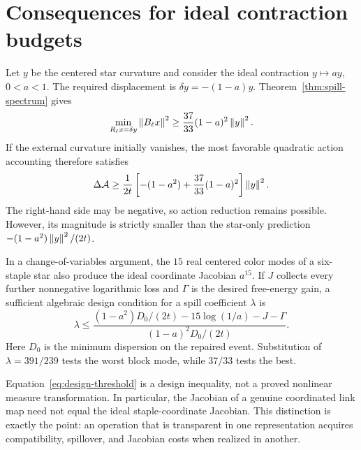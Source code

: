 \section{Consequences for ideal contraction budgets}
\label{sec:repair}

Let $y$ be the centered star curvature and consider the ideal contraction
$y\mapsto ay$, $0<a<1$.  The required displacement is
$\delta y=-(1-a)y$.  Theorem~\ref{thm:spill-spectrum} gives
\[
 \min_{R_\ell x=\delta y}\left\lVert B_\ell x\right\rVert^2
 \ge \frac{37}{33}(1-a)^2\left\lVert y\right\rVert^2.
\]
If the external curvature initially vanishes, the most favorable quadratic
action accounting therefore satisfies
\begin{equation}
\label{eq:action-budget}
 \Delta\mathcal A
 \ge \frac1{2t}\left[
   -(1-a^2)+\frac{37}{33}(1-a)^2
 \right]\left\lVert y\right\rVert^2.
\end{equation}
The right-hand side may be negative, so action reduction remains possible.
However, its magnitude is strictly smaller than the star-only prediction
$-(1-a^2)\left\lVert y\right\rVert^2/(2t)$.

In a change-of-variables argument, the $15$ real centered color modes of a
six-staple star also produce the ideal coordinate Jacobian $a^{15}$.  If $J$
collects every further nonnegative logarithmic loss and $\Gamma$ is the desired
free-energy gain, a sufficient algebraic design condition for a spill
coefficient $\lambda$ is
\begin{equation}
\label{eq:design-threshold}
 \lambda\le
 \frac{(1-a^2)D_0/(2t)-15\log(1/a)-J-\Gamma}
 {(1-a)^2D_0/(2t)}.
\end{equation}
Here $D_0$ is the minimum dispersion on the repaired event.  Substitution of
$\lambda=391/239$ tests the worst block mode, while $37/33$ tests the best.

Equation~\eqref{eq:design-threshold} is a design inequality, not a proved
nonlinear measure transformation.  In particular, the Jacobian of a genuine
coordinated link map need not equal the ideal staple-coordinate Jacobian.
This distinction is exactly the point: an operation that is transparent in
one representation acquires compatibility, spillover, and Jacobian costs when
realized in another.
